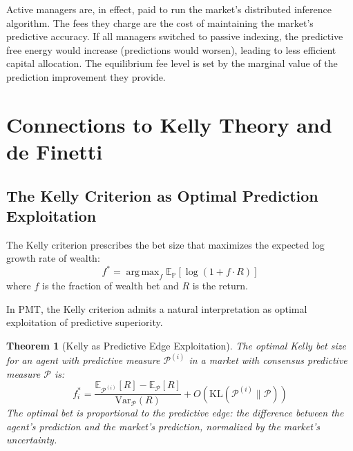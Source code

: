 \documentclass[12pt,a4paper]{article}
\newtheorem{theorem}{Theorem}[section]
\theoremstyle{definition}
\newcommand{\E}{\mathbb{E}}
\newcommand{\Prob}{\mathbb{P}}
\newcommand{\PP}{\mathcal{P}}
\newcommand{\KL}{\mathrm{KL}}
\newcommand{\Var}{\mathrm{Var}}
\DeclareMathOperator*{\argmax}{arg\,max}
\begin{document}
Active managers are, in effect, paid to run the market's distributed inference algorithm. The fees they charge are the cost of maintaining the market's predictive accuracy. If all managers switched to passive indexing, the predictive free energy would increase (predictions would worsen), leading to less efficient capital allocation. The equilibrium fee level is set by the marginal value of the prediction improvement they provide.



\section{Connections to Kelly Theory and de Finetti}\label{sec:connections}

\subsection{The Kelly Criterion as Optimal Prediction Exploitation}

The Kelly criterion \citep{kelly1956} prescribes the bet size that maximizes the expected log growth rate of wealth:
\begin{equation}\label{eq:kelly}
    f^* = \argmax_f \E_\Prob[\log(1 + f \cdot R)]
\end{equation}
where $f$ is the fraction of wealth bet and $R$ is the return.

In PMT, the Kelly criterion admits a natural interpretation as optimal exploitation of predictive superiority.

\begin{theorem}[Kelly as Predictive Edge Exploitation]\label{thm:kelly_pmt}
The optimal Kelly bet size for an agent with predictive measure $\PP^{(i)}$ in a market with consensus predictive measure $\PP$ is:
\begin{equation}\label{eq:kelly_pmt}
    f^*_i = \frac{\E_{\PP^{(i)}}[R] - \E_\PP[R]}{\Var_\PP(R)} + O\left(\KL(\PP^{(i)} \| \PP)\right)
\end{equation}
The optimal bet is proportional to the predictive edge: the difference between the agent's prediction and the market's prediction, normalized by the market's uncertainty.
\end{theorem}
\end{document}

